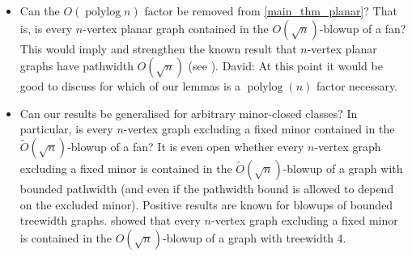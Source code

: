 \documentclass{patmorin}
\newcommand{\david}[1]{{\color{orange} David: #1}}
\DeclareMathOperator{\polylog}{polylog}
\begin{document}
%

\begin{itemize}
\item Can the $O(\polylog n)$ factor be removed from \cref{main_thm_planar}? That is, is every $n$-vertex planar graph contained in the $O(\sqrt{n})$-blowup of a fan? This would imply and strengthen the known result that $n$-vertex planar graphs have pathwidth $O(\sqrt{n})$ (see \citep{Bodlaender98}). \david{At this point it would be good to discuss for which of our lemmas is a $\polylog(n)$ factor necessary.}

\item Can our results be generalised for arbitrary minor-closed classes? In particular, is every $n$-vertex  graph excluding a fixed minor contained in the $\tilde{O}(\sqrt{n})$-blowup of a fan? It is even open  whether every $n$-vertex graph excluding a fixed minor is contained in the $\tilde{O}(\sqrt{n})$-blowup of a graph with bounded pathwidth (and even if the pathwidth bound is allowed to depend on the excluded minor).  Positive results are known for blowups of bounded treewidth graphs. \citet{distel.dujmovic.ea:product} showed that every $n$-vertex graph excluding a fixed minor is contained in the $O(\sqrt{n})$-blowup of a graph with treewidth 4.
\end{itemize}
\end{document}
